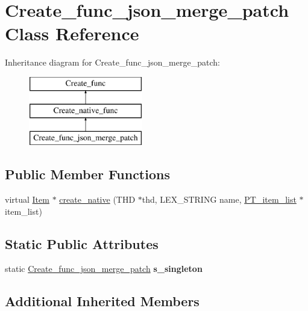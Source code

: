 \hypertarget{classCreate__func__json__merge__patch}{}\section{Create\+\_\+func\+\_\+json\+\_\+merge\+\_\+patch Class Reference}
\label{classCreate__func__json__merge__patch}
Inheritance diagram for Create\+\_\+func\+\_\+json\+\_\+merge\+\_\+patch\+:\begin{figure}[H]
\begin{center}
\leavevmode
\includegraphics[height=3.000000cm]{classCreate__func__json__merge__patch}
\end{center}
\end{figure}
\subsection*{Public Member Functions}
\begin{DoxyCompactItemize}
\item 
virtual \mbox{\hyperlink{classItem}{Item}} $\ast$ \mbox{\hyperlink{classCreate__func__json__merge__patch_a7d91e95c4f197d192c4cd0f4f5465185}{create\+\_\+native}} (T\+HD $\ast$thd, L\+E\+X\+\_\+\+S\+T\+R\+I\+NG name, \mbox{\hyperlink{classPT__item__list}{P\+T\+\_\+item\+\_\+list}} $\ast$item\+\_\+list)
\end{DoxyCompactItemize}
\subsection*{Static Public Attributes}
\begin{DoxyCompactItemize}
\item 
\mbox{\label{classCreate__func__json__merge__patch_adbdea3048964f6215ce01beb13f524c9}} 
static \mbox{\hyperlink{classCreate__func__json__merge__patch}{Create\+\_\+func\+\_\+json\+\_\+merge\+\_\+patch}} {\bfseries s\+\_\+singleton}
\end{DoxyCompactItemize}
\subsection*{Additional Inherited Members}


